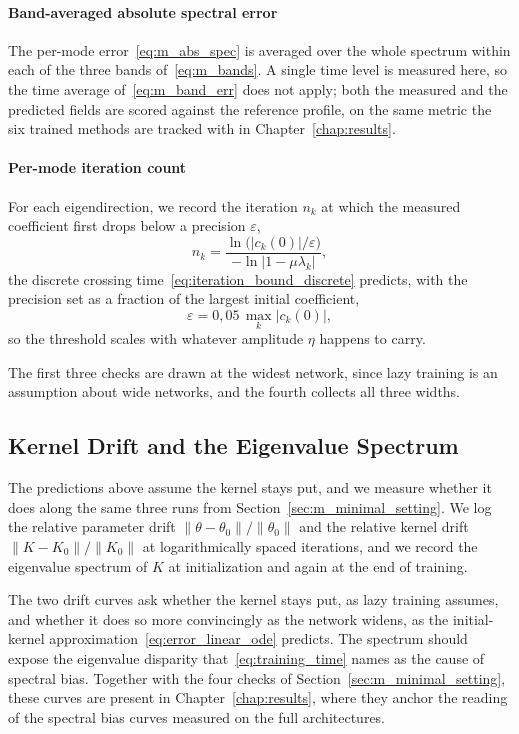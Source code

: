 \paragraph{Band-averaged absolute spectral error} The per-mode error~\eqref{eq:m_abs_spec} is averaged over the whole spectrum within each of the three bands of~\eqref{eq:m_bands}. A single time level is measured here, so the time average of~\eqref{eq:m_band_err} does not apply; both the measured and the predicted fields are scored against the reference profile, on the same metric the six trained methods are tracked with in Chapter~\ref{chap:results}.

\paragraph{Per-mode iteration count} For each eigendirection, we record the iteration $n_k$ at which the measured coefficient first drops below a precision $\varepsilon$,
\begin{equation}\label{eq:m_minimal_nk}
    n_k = \frac{\ln\bigl(|c_k(0)|/\varepsilon\bigr)}{-\ln|1-\mu\lambda_k|},
\end{equation}
the discrete crossing time~\eqref{eq:iteration_bound_discrete} predicts, with the precision set as a fraction of the largest initial coefficient,
\begin{equation*}
    \varepsilon = 0{,}05\,\max_k |c_k(0)|,
\end{equation*}
so the threshold scales with whatever amplitude $\eta$ happens to carry.

The first three checks are drawn at the widest network, since lazy training is an assumption about wide networks, and the fourth collects all three widths.

\subsection{Kernel Drift and the Eigenvalue Spectrum}
\label{sec:m_minimal_ntk}

The predictions above assume the kernel stays put, and we measure whether it does along the same three runs from Section~\ref{sec:m_minimal_setting}. We log the relative parameter drift $\|\theta - \theta_0\| / \|\theta_0\|$ and the relative kernel drift $\|K - K_0\| / \|K_0\|$ at logarithmically spaced iterations, and we record the eigenvalue spectrum of $K$ at initialization and again at the end of training.

The two drift curves ask whether the kernel stays put, as lazy training assumes, and whether it does so more convincingly as the network widens, as the initial-kernel approximation~\eqref{eq:error_linear_ode} predicts. The spectrum should expose the eigenvalue disparity that~\eqref{eq:training_time} names as the cause of spectral bias. Together with the four checks of Section~\ref{sec:m_minimal_setting}, these curves are present in Chapter~\ref{chap:results}, where they anchor the reading of the spectral bias curves measured on the full architectures.

